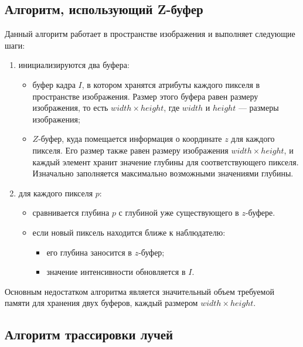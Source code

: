 \subsection{Алгоритм, использующий Z-буфер}

Данный алгоритм работает в пространстве изображения \cite{Rodgers} и выполняет следующие шаги:  

\begin{enumerate}  
    \item инициализируются два буфера:  
    \begin{itemize}  
        \item буфер кадра $I$, в котором хранятся атрибуты каждого пикселя в пространстве изображения. Размер этого буфера равен размеру изображения, то есть \( width \times height \), где \( width \) и \( height \) — размеры изображения;  
        \item $Z$-буфер, куда помещается информация о координате $z$ для каждого пикселя. Его размер также равен размеру изображения \( width \times height \), и каждый элемент хранит значение глубины для соответствующего пикселя. Изначально заполняется максимально возможными значениями глубины.
    \end{itemize}  

    \item для каждого пикселя $p$:  
    \begin{itemize}  
        \item сравнивается глубина $p$ с глубиной уже существующего в $z$-буфере.  
        \item если новый пиксель находится ближе к наблюдателю:  
        \begin{itemize}  
            \item его глубина заносится в $z$-буфер;  
            \item значение интенсивности обновляется в $I$.  
        \end{itemize}  
    \end{itemize}  
\end{enumerate}  

Основным недостатком алгоритма является значительный объем требуемой памяти для хранения двух буферов, каждый размером \( width \times height \). ~\cite{Rodgers}

\subsection{Алгоритм трассировки лучей}

